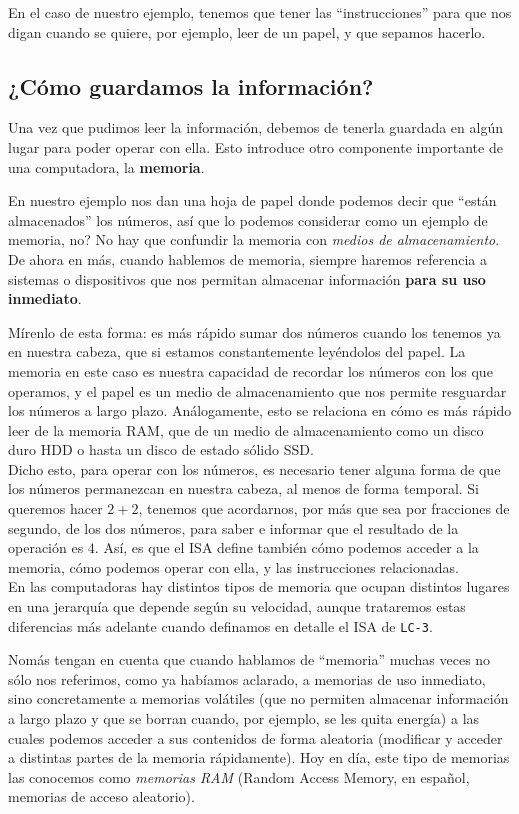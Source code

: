 \documentclass[a4paper, titlepage]{report}
\begin{document}
	En el caso de nuestro ejemplo, tenemos que tener las ``instrucciones'' para que nos digan cuando se quiere, por ejemplo, leer de un papel, y que sepamos hacerlo.
	
	\subsection{¿Cómo guardamos la información?}
	
	Una vez que pudimos leer la información, debemos de tenerla guardada en algún lugar para poder operar con ella. Esto introduce otro componente importante de una computadora, la \textbf{memoria}.
	
	En nuestro ejemplo nos dan una hoja de papel donde podemos decir que ``están almacenados'' los números, así que lo podemos considerar como un ejemplo de memoria, no? No hay que confundir la memoria con \textit{medios de almacenamiento}. De ahora en más, cuando hablemos de memoria, siempre haremos referencia a sistemas o dispositivos que nos permitan almacenar información \textbf{para su uso inmediato}.
	
	Mírenlo de esta forma: es más rápido sumar dos números cuando los tenemos ya en nuestra cabeza, que si estamos constantemente leyéndolos del papel. La memoria en este caso es nuestra capacidad de recordar los números con los que operamos, y el papel es un medio de almacenamiento que nos permite resguardar los números a largo plazo. Análogamente, esto se relaciona en cómo es más rápido leer de la memoria RAM, que de un medio de almacenamiento como un disco duro HDD o hasta un disco de estado sólido SSD.\\
	
	Dicho esto, para operar con los números, es necesario tener alguna forma de que los números permanezcan en nuestra cabeza, al menos de forma temporal. Si queremos hacer $2+2$, tenemos que acordarnos, por más que sea por fracciones de segundo, de los dos números, para saber e informar que el resultado de la operación es $4$. Así, es que el ISA define también cómo podemos acceder a la memoria, cómo podemos operar con ella, y las instrucciones relacionadas.\\
	
	En las computadoras hay distintos tipos de memoria que ocupan distintos lugares en una jerarquía que depende según su velocidad, aunque trataremos estas diferencias más adelante cuando definamos en detalle el ISA de \texttt{LC-3}.
	
	Nomás tengan en cuenta que cuando hablamos de ``memoria'' muchas veces no sólo nos referimos, como ya habíamos aclarado, a memorias de uso inmediato, sino concretamente a memorias volátiles (que no permiten almacenar información a largo plazo y que se borran cuando, por ejemplo, se les quita energía) a las cuales podemos acceder a sus contenidos de forma aleatoria (modificar y acceder a distintas partes de la memoria rápidamente). Hoy en día, este tipo de memorias las conocemos como \textit{memorias RAM} (Random Access Memory, en español, memorias de acceso aleatorio).
	
\end{document}

